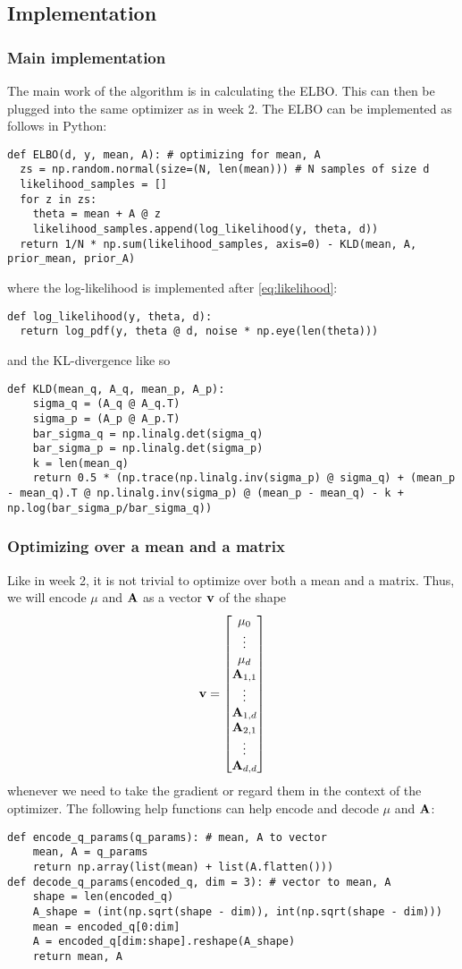 \subsection{Implementation}
\subsubsection{Main implementation}
The main work of the algorithm is in calculating the ELBO. This can then be plugged into the same optimizer as in week 2.
The ELBO can be implemented as follows in Python:
\begin{verbatim}
def ELBO(d, y, mean, A): # optimizing for mean, A
  zs = np.random.normal(size=(N, len(mean))) # N samples of size d
  likelihood_samples = []
  for z in zs:
    theta = mean + A @ z
    likelihood_samples.append(log_likelihood(y, theta, d))
  return 1/N * np.sum(likelihood_samples, axis=0) - KLD(mean, A, prior_mean, prior_A)
\end{verbatim}
where the log-likelihood is implemented after \eqref{eq:likelihood}:
\begin{verbatim}
def log_likelihood(y, theta, d):
  return log_pdf(y, theta @ d, noise * np.eye(len(theta)))
\end{verbatim}
and the KL-divergence like so
\begin{verbatim}
def KLD(mean_q, A_q, mean_p, A_p):
    sigma_q = (A_q @ A_q.T)
    sigma_p = (A_p @ A_p.T)
    bar_sigma_q = np.linalg.det(sigma_q)
    bar_sigma_p = np.linalg.det(sigma_p)
    k = len(mean_q)
    return 0.5 * (np.trace(np.linalg.inv(sigma_p) @ sigma_q) + (mean_p - mean_q).T @ np.linalg.inv(sigma_p) @ (mean_p - mean_q) - k + np.log(bar_sigma_p/bar_sigma_q))
\end{verbatim}
\subsubsection{Optimizing over a mean and a matrix}
Like in week 2, it is not trivial to optimize over both a mean and a matrix. Thus, we will encode $\mu$ and $\mathbf{A}$ as a vector $\mathbf{v}$ of the shape
$$\mathbf{v}=\begin{bmatrix}\mu_0 \\ \vdots \\ \mu_d \\ \mathbf{A}_{1,1} \\ \vdots \\ \mathbf{A}_{1,d} \\ \mathbf{A}_{2,1} \\ \vdots \\ \mathbf{A}_{d, d}\end{bmatrix}$$
whenever we need to take the gradient or regard them in the context of the optimizer.
The following help functions can help encode and decode $\mu$ and $\mathbf{A}$:
\begin{verbatim}
def encode_q_params(q_params): # mean, A to vector
    mean, A = q_params
    return np.array(list(mean) + list(A.flatten()))
def decode_q_params(encoded_q, dim = 3): # vector to mean, A
    shape = len(encoded_q)
    A_shape = (int(np.sqrt(shape - dim)), int(np.sqrt(shape - dim)))
    mean = encoded_q[0:dim]
    A = encoded_q[dim:shape].reshape(A_shape)
    return mean, A
\end{verbatim}
